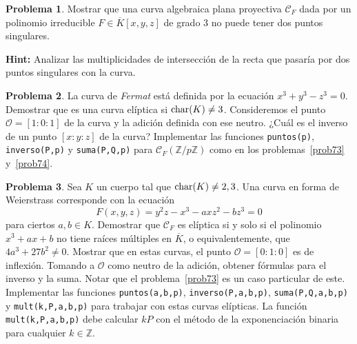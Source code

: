 \documentclass[a4paper, 11pt]{article}
\newcommand{\ZZ}{\mathbb{Z}}
\newcounter{numerodetema}
\theoremstyle{plain}
\theoremstyle{definition}
\newtheorem{prob}{Problema}[numerodetema]
\begin{document}
\begin{prob}
Mostrar que una curva algebraica plana proyectiva $\mathcal{C}_F$ dada por un polinomio
irreducible $F\in\overline{K}[x,y,z]$ de grado $3$ no puede tener dos puntos singulares.

{\bf Hint:} Analizar las multiplicidades de intersección de la recta que pasaría por
dos puntos singulares con la curva.
\end{prob}

\begin{prob}
La curva de \emph{Fermat} está definida por la ecuación $x^3+y^3-z^3=0$. Demostrar que es
una curva elíptica si ${\rm char}(K)\neq3$. Consideremos el punto $\mathcal{O}=[1:0:1]$
de la curva y la adición definida con ese neutro. ¿Cuál es el inverso de un punto
$[x:y:z]$ de la curva? Implementar las funciones \texttt{puntos(p)}, \texttt{inverso(P,p)}
y \texttt{suma(P,Q,p)} para $\mathcal{C}_F(\ZZ/p\ZZ)$ como en los problemas~\ref{prob73}
y~\ref{prob74}.
\end{prob}

\begin{prob}
Sea $K$ un cuerpo tal que ${\rm char}(K)\neq 2,3$. Una curva en forma de Weierstrass
corresponde con la ecuación
\[
   F(x,y,z)=y^2z-x^3-axz^2-bz^3=0
\]
para ciertos $a,b\in K$. Demostrar que $\mathcal{C}_F$ es elíptica si y solo si
el polinomio $x^3+ax+b$ no tiene raíces múltiples en $\overline{K}$, o equivalentemente,
que $4a^3+27b^2\neq 0$. Mostrar que en estas curvas, el punto $\mathcal{O}=[0:1:0]$
es de inflexión. Tomando a $\mathcal{O}$ como neutro de la adición, obtener fórmulas
para el inverso y la suma. Notar que el problema~\ref{prob73} es un caso particular
de este. Implementar las funciones \texttt{puntos(a,b,p)}, \texttt{inverso(P,a,b,p)},
\texttt{suma(P,Q,a,b,p)} y \texttt{mult(k,P,a,b,p)} para trabajar con estas
curvas elípticas. La función \texttt{mult(k,P,a,b,p)} debe calcular $kP$ con el método de
la exponenciación binaria para cualquier $k\in\ZZ$.
\end{prob}
\end{document}
